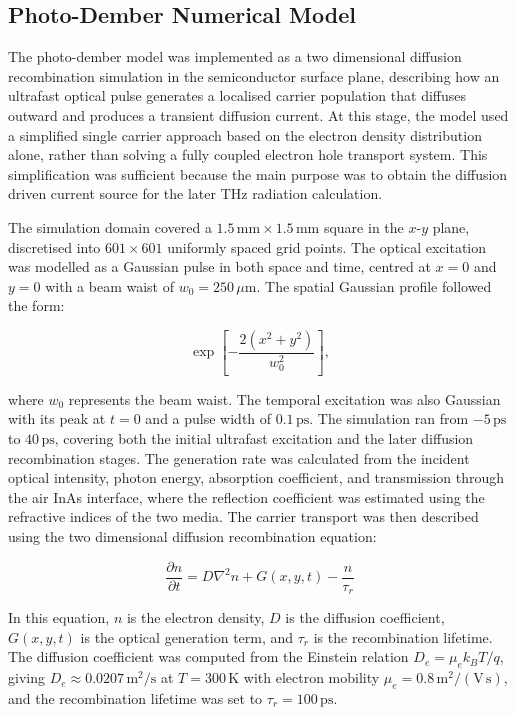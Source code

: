 \documentclass[12pt]{final_project_report}
\begin{document}
\subsection{Photo-Dember Numerical Model}

The photo-dember model was implemented as a two dimensional diffusion recombination simulation in the semiconductor surface plane, describing how an ultrafast optical pulse generates a localised carrier population that diffuses outward and produces a transient diffusion current. At this stage, the model used a simplified single carrier approach based on the electron density distribution alone, rather than solving a fully coupled electron hole transport system. This simplification was sufficient because the main purpose was to obtain the diffusion driven current source for the later THz radiation calculation.

The simulation domain covered a $1.5\,\mathrm{mm} \times 1.5\,\mathrm{mm}$ square in the $x$-$y$ plane, discretised into $601 \times 601$ uniformly spaced grid points. The optical excitation was modelled as a Gaussian pulse in both space and time, centred at $x = 0$ and $y = 0$ with a beam waist of $w_0 = 250\,\mu\mathrm{m}$. The spatial Gaussian profile followed the form:

\begin{equation}
    \exp\!\left[-\frac{2(x^2 + y^2)}{w_0^2}\right],
\end{equation}

where $w_0$ represents the beam waist. The temporal excitation was also Gaussian with its peak at $t = 0$ and a pulse width of $0.1\,\mathrm{ps}$. The simulation ran from $-5\,\mathrm{ps}$ to $40\,\mathrm{ps}$, covering both the initial ultrafast excitation and the later diffusion recombination stages. The generation rate was calculated from the incident optical intensity, photon energy, absorption coefficient, and transmission through the air InAs interface, where the reflection coefficient was estimated using the refractive indices of the two media. The carrier transport was then described using the two dimensional diffusion recombination equation:

\begin{equation}
    \frac{\partial n}{\partial t} = D\nabla^2 n + G(x,y,t) - \frac{n}{\tau_r}
\end{equation}

In this equation, $n$ is the electron density, $D$ is the diffusion coefficient, $G(x,y,t)$ is the optical generation term, and $\tau_r$ is the recombination lifetime. The diffusion coefficient was computed from the Einstein relation $D_e = \mu_e k_B T / q$, giving $D_e \approx 0.0207\,\mathrm{m^2/s}$ at $T = 300\,\mathrm{K}$ with electron mobility $\mu_e = 0.8\,\mathrm{m^2/(V\,s)}$, and the recombination lifetime was set to $\tau_r = 100\,\mathrm{ps}$.
\end{document}
